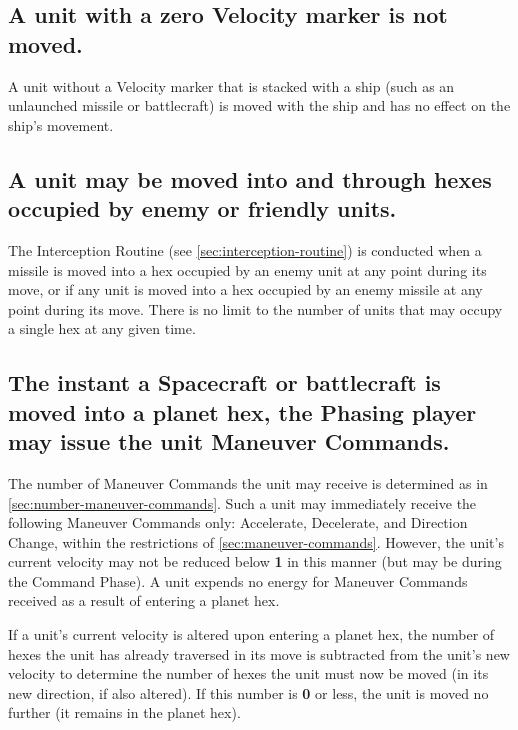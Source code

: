 \subsection[Zero Velocity]{A unit with a zero Velocity marker is not moved.}
\label{sec:zero-velocity}



A unit without a Velocity marker that is stacked with a ship (such as
an unlaunched missile or battlecraft) is moved with the ship and has
no effect on the ship's movement.


\subsection[Occupied Hexes]{A unit may be moved into and through hexes
  occupied by 
  enemy or friendly units.}
\label{sec:occupied-hexes}



The Interception Routine (see \ref{sec:interception-routine}) is
conducted when a missile is moved into a hex occupied by an enemy unit
at any point during its move, or if any unit is moved into a hex
occupied by an enemy missile at any point during its move. There is no
limit to the number of units that may occupy a single hex at any given
time.


\subsection[Planets And Maneuvering]{The instant a Spacecraft or
  battlecraft is moved into a planet hex, the Phasing player may issue
  the unit  
  Maneuver Commands.}
\label{sec:planets-maneuvering}

 

The number of Maneuver Commands the unit may receive is determined as
in \ref{sec:number-maneuver-commands}. Such a unit may immediately
receive the following Maneuver Commands only: Accelerate, Decelerate,
and Direction Change, within the restrictions of
\ref{sec:maneuver-commands}. However, the unit's current velocity may
not be reduced below \textbf{1} in this manner (but may be during the
Command Phase). A unit expends no energy for Maneuver Commands
received as a result of entering a planet hex.

If a unit's current velocity is altered upon entering a planet hex,
the number of hexes the unit has already traversed in its move is
subtracted from the unit's new velocity to determine the number of
hexes the unit must now be moved (in its new direction, if also
altered). If this number is \textbf{0} or less, the unit is moved no
further (it remains in the planet hex).

